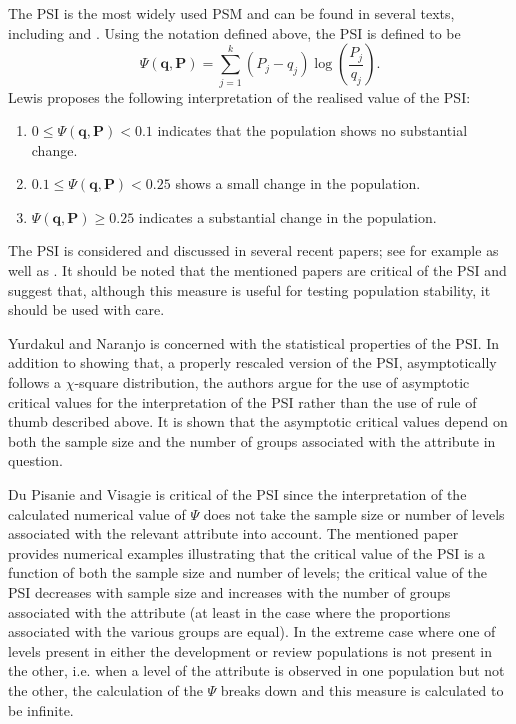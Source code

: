 \documentclass{article}
\theoremstyle{def}
\begin{document}
The PSI is the most widely used PSM and can be found in several texts, including \cite{Lew1994} and \cite{SIDDIQI2006}. Using the notation defined above, the PSI is defined to be
\begin{equation}
    \Psi(\mathbf{q},\mathbf{P}) = \sum_{j=1}^{k} (P_j - q_j)\log \left(\frac{P_j}{q_j}\right).
\end{equation}
Lewis \cite{Lew1994} proposes the following interpretation of the realised value of the PSI:
\begin{enumerate}
    \item $0 \leq \Psi(\mathbf{q},\mathbf{P}) < 0.1$ indicates that the population shows no substantial change.
    \item $0.1 \leq \Psi(\mathbf{q},\mathbf{P}) < 0.25$ shows a small change in the population.
    \item $\Psi(\mathbf{q},\mathbf{P}) \geq 0.25$ indicates a substantial change in the population.
\end{enumerate}

The PSI is considered and discussed in several recent papers; see for example \cite{YN2019} as well as \cite{DUPISANIEVISAGIE2020}. It should be noted that the mentioned papers are critical of the PSI and suggest that, although this measure is useful for testing population stability, it should be used with care.

Yurdakul and Naranjo \cite{YN2019} is concerned with the statistical properties of the PSI. In addition to showing that, a properly rescaled version of the PSI, asymptotically follows a $\chi$-square distribution, the authors argue for the use of asymptotic critical values for the interpretation of the PSI rather than the use of rule of thumb described above. It is shown that the asymptotic critical values depend on both the sample size and the number of groups associated with the attribute in question.

Du Pisanie and Visagie \cite{DUPISANIEVISAGIE2020} is critical of the PSI since the interpretation of the calculated numerical value of $\Psi$ does not take the sample size or number of levels associated with the relevant attribute into account. The mentioned paper provides numerical examples illustrating that the critical value of the PSI is a function of both the sample size and number of levels; the critical value of the PSI decreases with sample size and increases with the number of groups associated with the attribute (at least in the case where the proportions associated with the various groups are equal). In the extreme case where one of levels present in either the development or review populations is not present in the other, i.e. when a level of the attribute is observed in one population but not the other, the calculation of the $\Psi$ breaks down and this measure is calculated to be infinite.
\end{document}
